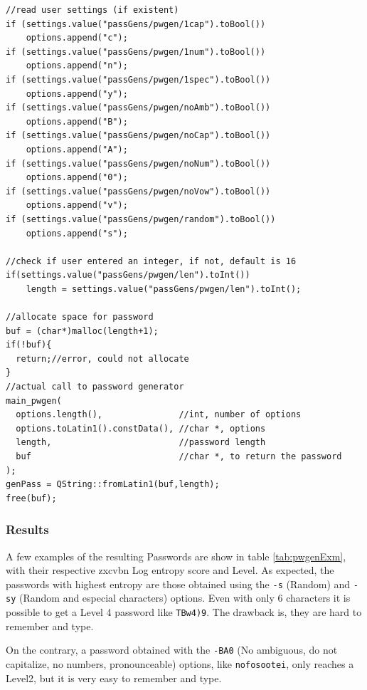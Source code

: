 \begin{lstlisting}[style=customc, float=htb, caption={PwGen call inside AddEntry}, label = {lis:pwgen}]
//read user settings (if existent)
if (settings.value("passGens/pwgen/1cap").toBool())
    options.append("c");
if (settings.value("passGens/pwgen/1num").toBool())
    options.append("n");
if (settings.value("passGens/pwgen/1spec").toBool())
    options.append("y");
if (settings.value("passGens/pwgen/noAmb").toBool())
    options.append("B");
if (settings.value("passGens/pwgen/noCap").toBool())
    options.append("A");
if (settings.value("passGens/pwgen/noNum").toBool())
    options.append("0");
if (settings.value("passGens/pwgen/noVow").toBool())
    options.append("v");
if (settings.value("passGens/pwgen/random").toBool())
    options.append("s");

//check if user entered an integer, if not, default is 16
if(settings.value("passGens/pwgen/len").toInt())
    length = settings.value("passGens/pwgen/len").toInt();

//allocate space for password
buf = (char*)malloc(length+1);
if(!buf){
  return;//error, could not allocate
}
//actual call to password generator
main_pwgen(
  options.length(),               //int, number of options 
  options.toLatin1().constData(), //char *, options 
  length,                         //password length 
  buf                             //char *, to return the password           
);
genPass = QString::fromLatin1(buf,length);
free(buf);
\end{lstlisting}

\subsubsection*{Results}

A few examples of the resulting Passwords are show in table \ref{tab:pwgenExm}, with their respective zxcvbn Log entropy score and Level. As expected, the passwords with highest entropy are those obtained using the \texttt{-s} (Random) and \texttt{-sy} (Random and especial characters) options. Even with only 6 characters it is possible to get a Level 4 password like \texttt{TBw4)9}. The drawback is, they are hard to remember and type. 

On the contrary, a password obtained with the \texttt{-BA0} (No ambiguous, do not capitalize, no numbers, pronounceable) options, like \texttt{nofosootei}, only reaches a Level2, but it is very easy to remember and type.

